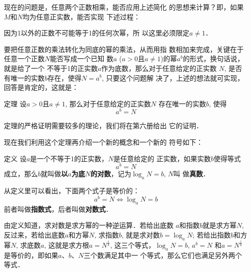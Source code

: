 现在的问题是，任意两个正数相乘，能否应用上述简化
的思想来计算？即，如果$M$和$N$均为任意正实数，能否实现
下述过程：
\begin{center}
\end{center}

\begin{rmk}
    因为1以外的正数不可能等于1的任何次幂，所
以这里必须限定$a\ne 1$．
\end{rmk}

要把任意正数的乘法转化为同底的幂的乘法，从而用指
数相加来完成，关键在于任意一个正数$N$能否写成一个已知
数$a$ ($a>0$且$a\ne1$)的幂$a^b$的形式，换句话说，就是给了一个
不等于1的正实数$a$作为底数，那么对于任意给定的正实数
$N$, 是否有唯一的实数$b$存在，使得$N=a^b$, 只要这个问题解
决了，上述的想法就可实现，回答是肯定的，这就是：

\begin{blk}{定理}
    设$a>0$且$a\ne 1$, 那么对于任意给定的正实数$N$
存在唯一的实数$b$, 使得
\[a^b=N\]
\end{blk}
 
定理的严格证明需要较多的理论，我们将在第六册给出
它的证明．

现在我们利用这个定理再介绍一个新的概念和一个新的
符号如下：

\begin{blk}{定义}
    设$a$是一个不等于1的正实数，$N$是任意给定的
正实数，如果实数$b$使得等式
\[a^b=N\]
成立，那么$b$就叫做\textbf{以$a$为底$N$的对数}，记为$\log_a N=b$, $N$叫
做\textbf{真数}．
\end{blk}
 
从定义里可以看出，下面两个式子是等价的：
\[a^b=N  \Longleftrightarrow \log_a N=b\]
前者叫做\textbf{指数式}，后者叫做\textbf{对数式}．

由定义知道，求对数是求方幂的一种逆运算．若给出底数
$a$和指数$b$就是求方幂$N$, 反过来，若给出底数$a$和方幂$N$, 
求指数$b$, 就是求对数$b=\log_a N$; 若给出指数$b$和方幂$N$, 求底数$a$, 这就是求方根$a=N^{\tfrac{1}{b}}$, 这三个等式，$\log_a N=b$, $a^b=N$
和$a=N^{\tfrac{1}{b}}$是等价的，即如果$a$、$b$、$N$三个数满足其中一
个等式，那么它们也满足另外两个等式．




